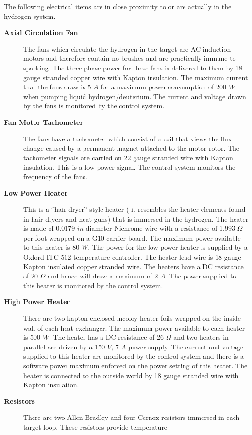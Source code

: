 {The following electrical items are in close proximity to
or are actually in the hydrogen system.

\begin{description}
\item[{\bf Axial Circulation Fan}] The fans which 
circulate the hydrogen in the target are AC induction motors
and therefore contain no brushes and are practically immune to sparking.
The three phase power for these fans is delivered to them by 18
gauge stranded copper wire with Kapton insulation.
The maximum current that 
the fans draw is 5 $A$ for a maximum power consumption of
200 $W$ when pumping liquid hydrogen/deuterium. The current and voltage drawn
by the fans is monitored by the control system.
\item[{\bf Fan Motor Tachometer}]
The fans have a tachometer which consist of a
coil that views the flux change caused by a permanent magnet attached to 
the motor rotor. The tachometer signals are carried on 22 gauge stranded wire
with Kapton insulation. This is a low power signal. The control system
monitors the frequency of the fans.
\item[{\bf Low Power Heater}] This is a ``hair dryer'' style heater ( it 
resembles the heater elements found in hair dryers and heat guns) that
is immersed in the hydrogen. The heater is made of 0.0179 $in$ diameter
Nichrome wire with a resistance of 1.993 $\Omega$ per foot wrapped
on a G10 carrier board.
The maximum power available to this
heater is 80 $W$. The power for the low power heater is supplied by
a Oxford ITC-502 temperature controller. The heater lead wire is
18 gauge Kapton insulated copper stranded wire. The heaters have a
DC resistance of 20 $\Omega$ and hence will draw a maximum of 2 $A$. 
The power supplied to this heater is monitored by the control system.
\item[{\bf High Power Heater}]There are two kapton enclosed incoloy heater foils
wrapped on the inside wall of each heat exchanger.
The maximum power available to each
heater is  500 $W$. The heater has a DC resistance of
26 $\Omega$ and two heaters in parallel
are driven by a 150 $V$, 7 $A$ power supply.
The current and voltage supplied to this heater are monitored by the control
system and there
is a software power maximum enforced on the power setting
of this heater. 
The heater is connected to
the outside world by 18 gauge stranded wire with Kapton insulation.
\item[{\bf Resistors}] There are two Allen Bradley and four Cernox
resistors immersed in each target loop. These resistors provide temperature

\end{description}}
